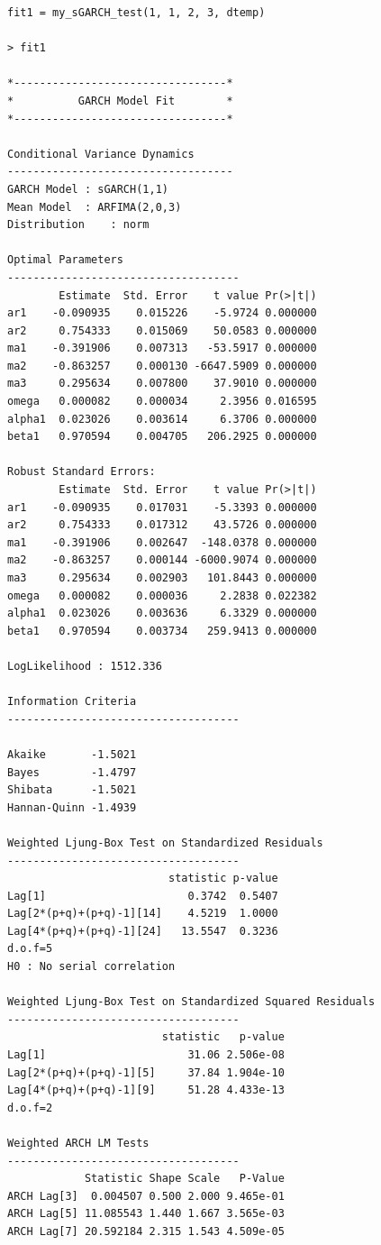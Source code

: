 \documentclass[a4paper, 11pt]{article}
\begin{document}
\begin{verbatim}
fit1 = my_sGARCH_test(1, 1, 2, 3, dtemp)

> fit1

*---------------------------------*
*          GARCH Model Fit        *
*---------------------------------*

Conditional Variance Dynamics 	
-----------------------------------
GARCH Model	: sGARCH(1,1)
Mean Model	: ARFIMA(2,0,3)
Distribution	: norm 

Optimal Parameters
------------------------------------
        Estimate  Std. Error    t value Pr(>|t|)
ar1    -0.090935    0.015226    -5.9724 0.000000
ar2     0.754333    0.015069    50.0583 0.000000
ma1    -0.391906    0.007313   -53.5917 0.000000
ma2    -0.863257    0.000130 -6647.5909 0.000000
ma3     0.295634    0.007800    37.9010 0.000000
omega   0.000082    0.000034     2.3956 0.016595
alpha1  0.023026    0.003614     6.3706 0.000000
beta1   0.970594    0.004705   206.2925 0.000000

Robust Standard Errors:
        Estimate  Std. Error    t value Pr(>|t|)
ar1    -0.090935    0.017031    -5.3393 0.000000
ar2     0.754333    0.017312    43.5726 0.000000
ma1    -0.391906    0.002647  -148.0378 0.000000
ma2    -0.863257    0.000144 -6000.9074 0.000000
ma3     0.295634    0.002903   101.8443 0.000000
omega   0.000082    0.000036     2.2838 0.022382
alpha1  0.023026    0.003636     6.3329 0.000000
beta1   0.970594    0.003734   259.9413 0.000000

LogLikelihood : 1512.336 

Information Criteria
------------------------------------
                    
Akaike       -1.5021
Bayes        -1.4797
Shibata      -1.5021
Hannan-Quinn -1.4939

Weighted Ljung-Box Test on Standardized Residuals
------------------------------------
                         statistic p-value
Lag[1]                      0.3742  0.5407
Lag[2*(p+q)+(p+q)-1][14]    4.5219  1.0000
Lag[4*(p+q)+(p+q)-1][24]   13.5547  0.3236
d.o.f=5
H0 : No serial correlation

Weighted Ljung-Box Test on Standardized Squared Residuals
------------------------------------
                        statistic   p-value
Lag[1]                      31.06 2.506e-08
Lag[2*(p+q)+(p+q)-1][5]     37.84 1.904e-10
Lag[4*(p+q)+(p+q)-1][9]     51.28 4.433e-13
d.o.f=2

Weighted ARCH LM Tests
------------------------------------
            Statistic Shape Scale   P-Value
ARCH Lag[3]  0.004507 0.500 2.000 9.465e-01
ARCH Lag[5] 11.085543 1.440 1.667 3.565e-03
ARCH Lag[7] 20.592184 2.315 1.543 4.509e-05


\end{verbatim}
\end{document}
